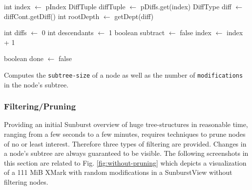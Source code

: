 \begin{algorithm}[tb]
{}
\BlankLine
int index $\leftarrow$ pIndex\;
DiffTuple diffTuple $\leftarrow$ pDiffs.get(index)\;
DiffType diff $\leftarrow$ diffCont.getDiff()\;
int rootDepth $\leftarrow$ getDept(diff)\;

int diffs $\leftarrow$ 0\;
int descendants $\leftarrow$ 1\;
boolean subtract $\leftarrow$ false\;
index $\leftarrow$ index + 1\;


boolean done $\leftarrow$ false\;
\caption{Computes the \texttt{subtree-size} of a node as well as the number of \texttt{modifications} in the node's subtree.}\label{algo:descModCount}
\end{algorithm}

\subsubsection{Filtering/Pruning}
Providing an initial Sunburst overview of huge tree-struc\-tures in reasonable time, ranging from a few seconds to a few minutes, requires techniques to prune nodes of no or least interest. Therefore three types of filtering are provided. Changes in a node's subtree are always guaranteed to be visible. The following screenshots in this section are related to Fig. \ref{fig:without-pruning} which depicts a visualization of a 111 MiB XMark with random modifications in a SunburstView without filtering nodes.

